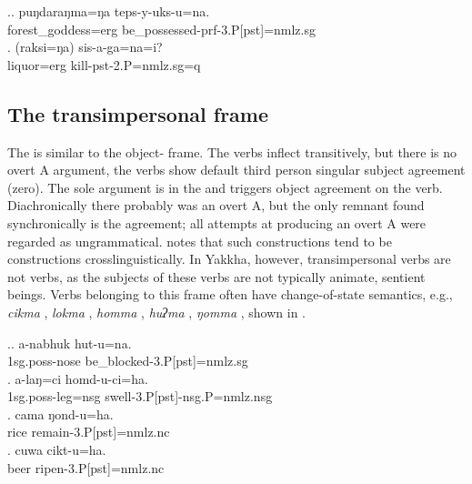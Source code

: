 \ex.\ag. puŋdaraŋma=ŋa  teps-y-uks-u=na.\\
forest\_goddess{\sc =erg} be\_possessed{\sc -prf-3.P[pst]=nmlz.sg}\\
\bg. (raksi=ŋa)  sis-a-ga=na=i?\\
		liquor{\sc =erg} kill{\sc -pst-2.P=nmlz.sg=q}\\


 
\subsection{The transimpersonal frame}\label{tr-imp}


\noindent
The   is similar to the object- frame. The verbs inflect transitively, but there is no overt A argument, the verbs show default third person singular subject agreement (zero). The sole argument is in the  and triggers  object agreement on the verb. Diachronically there probably was  an overt A, but the only remnant found synchronically is the agreement; all attempts at producing an overt A were regarded as ungrammatical. \citet{Malchukov2008Split} notes that such constructions tend to be  constructions crosslinguistically. In Yakkha, however, transimpersonal verbs are not  verbs, as the subjects of these verbs are not typically animate, sentient beings. Verbs belonging to this frame often have change-of-state semantics, e.g., \emph{cikma} , \emph{lokma} , \emph{homma} , \emph{huʔma} , \emph{ŋomma} , shown in \Next. 
 
\ex.\ag. a-nabhuk hut-u=na.\\
 {\sc 1sg.poss-}nose be\_blocked{\sc -3.P[pst]=nmlz.sg} \\
\bg. a-laŋ=ci homd-u-ci=ha.\\
 {\sc 1sg.poss-}leg{\sc =nsg} swell{\sc -3.P[pst]-nsg.P=nmlz.nsg} \\
 \bg. cama ŋond-u=ha.\\
rice remain{\sc -3.P[pst]=nmlz.nc}\\
\bg. cuwa cikt-u=ha.\\
beer ripen{\sc -3.P[pst]=nmlz.nc}\\
 
